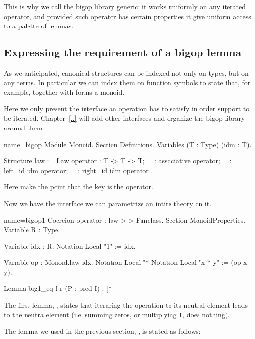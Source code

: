 This is why we call the bigop library generic: it works uniformly on
any iterated operator, and provided such operator has certain
properties it give uniform access to a palette of lemmas.

\subsection{Expressing the requirement of a bigop lemma}

As we anticipated, canonical structures can be indexed not only on
types, but on any terms.  In particular we can index them on function
symbols to state that, for example,  together with 
forms a monoid.

Here we only present the  interface an operation has to
satisfy in order support to be iterated.  Chapter~\ref{..} will add other
interfaces and organize the bigop library around them.

\begin{coq}{name=bigop}{}
Module Monoid.
Section Definitions.
Variables (T : Type) (idm : T).

Structure law := Law {
  operator : T -> T -> T;
  _ : associative operator;
  _ : left_id idm operator;
  _ : right_id idm operator
}.
\end{coq}

Here make the point that the key is the operator.

Now we have the interface we can parametrize an intire theory on it.

\begin{coq}{name=bigop1}{}
Coercion operator : law >-> Funclass.
Section MonoidProperties.
Variable R : Type.

Variable idx : R.
Notation Local "1" := idx.

Variable op : Monoid.law idx.
Notation Local "*%
Notation Local "x * y" := (op x y).

Lemma big1_eq I r (P : pred I) : \big[*%
\end{coq}

The first lemma, , states that iteraring the operation to
its neutral element leads to the neutra element (i.e. summing zeros,
or multiplying 1, does nothing).

The lemma we used in the previous section, , is
stated as follows:

